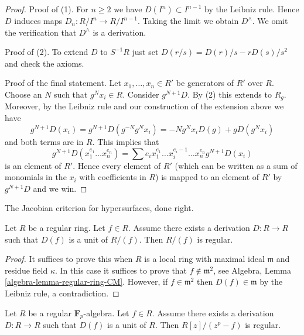 \begin{proof}
Proof of (1). For $n \geq 2$ we have $D(I^n) \subset I^{n - 1}$
by the Leibniz rule. Hence $D$ induces maps $D_n : R/I^n \to R/I^{n - 1}$.
Taking the limit we obtain $D^\wedge$. We omit the verification that
$D^\wedge$ is a derivation.

\medskip\noindent
Proof of (2). To extend $D$ to $S^{-1}R$ just set
$D(r/s) = D(r)/s - rD(s)/s^2$ and check the axioms.

\medskip\noindent
Proof of the final statement. Let $x_1, \ldots, x_n \in R'$ be generators
of $R'$ over $R$. Choose an $N$ such that $g^Nx_i \in R$.
Consider $g^{N + 1}D$. By (2) this extends to $R_g$. Moreover, by
the Leibniz rule and our construction of the extension above we have
$$
g^{N + 1}D(x_i) = g^{N + 1}D(g^{-N} g^Nx_i) = -Ng^Nx_iD(g) +
gD(g^Nx_i)
$$
and both terms are in $R$. This implies that
$$
g^{N + 1}D(x_1^{e_1} \ldots x_n^{e_n}) =
\sum e_i x_1^{e_1} \ldots x_i^{e_i - 1} \ldots x_n^{e_n} g^{N + 1}D(x_i)
$$
is an element of $R'$. Hence every element of $R'$ (which can be written
as a sum of monomials in the $x_i$ with coefficients in $R$) is mapped to an
element of $R'$ by $g^{N + 1}D$ and we win.
\end{proof}

\begin{lemma}
\label{lemma-quotient-regular}
\begin{slogan}
The Jacobian criterion for hypersurfaces, done right.
\end{slogan}
Let $R$ be a regular ring. Let $f \in R$. Assume there exists a
derivation $D : R \to R$ such that $D(f)$ is a unit of $R/(f)$.
Then $R/(f)$ is regular.
\end{lemma}

\begin{proof}
It suffices to prove this when $R$ is a local ring with maximal ideal
$\mathfrak m$ and residue field $\kappa$. In this case it suffices
to prove that $f \not \in \mathfrak m^2$, see
Algebra, Lemma \ref{algebra-lemma-regular-ring-CM}.
However, if $f \in \mathfrak m^2$ then $D(f) \in \mathfrak m$
by the Leibniz rule, a contradiction.
\end{proof}

\begin{lemma}
\label{lemma-degree-p-extension-regular}
Let $R$ be a regular $\mathbf{F}_p$-algebra. Let $f \in R$.
Assume there exists a derivation $D : R \to R$ such that $D(f)$ is a unit
of $R$. Then $R[z]/(z^p - f)$ is regular.
\end{lemma}

